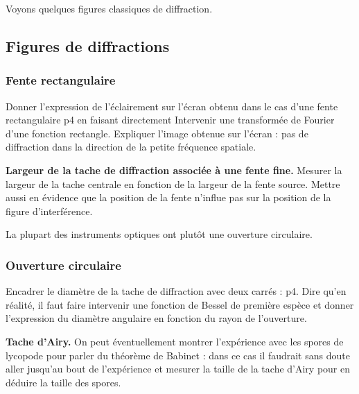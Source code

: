 \begin{transition}
Voyons quelques figures classiques de diffraction. 
\end{transition}

\subsection{Figures de diffractions}

\subsubsection{Fente rectangulaire}

Donner l'expression de l'éclairement sur l'écran obtenu dans le cas d'une fente rectangulaire \cite{Sayrin2019} p4 en faisant directement Intervenir une transformée de Fourier d'une fonction rectangle.
Expliquer l'image obtenue sur l'écran : pas de diffraction dans la direction de la petite fréquence spatiale.

\begin{experience}
\textbf{Largeur de la tache de diffraction associée à une fente fine.}
Mesurer la largeur de la tache centrale en fonction de la largeur de la fente source.
Mettre aussi en évidence que la position de la fente n'influe pas sur la position de la figure d'interférence.
\end{experience}

\begin{transition}
La plupart des instruments optiques ont plutôt une ouverture circulaire.
\end{transition}

\subsubsection{Ouverture circulaire}

Encadrer le diamètre de la tache de diffraction avec deux carrés : \cite{Sayrin2019} p4.
Dire qu'en réalité, il faut faire intervenir une fonction de Bessel de première espèce et donner l'expression du diamètre angulaire en fonction du rayon de l'ouverture.

\begin{experience}
\textbf{Tache d'Airy.}
On peut éventuellement montrer l'expérience avec les spores de lycopode pour parler du théorème de Babinet : dans ce cas il faudrait sans doute aller jusqu'au bout de l'expérience et mesurer la taille de la tache d'Airy pour en déduire la taille des spores.
\end{experience}

